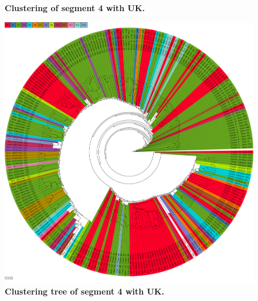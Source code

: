 \begin{figure}[!hbt]
\begin{subfigure}[b]{0.475\textwidth}
    \end{subfigure}
    \caption[Clustering of segment 4 with UK]{\textbf{Clustering of segment 4 with UK.} }
    \label{fig:UMAP_Cluster_Knee_4}
\end{figure}

\FloatBarrier

\begin{figure}[!hbt]
    \centering
    \includegraphics[width=\textwidth]{UMAP/Clustertree_Segment_4_H_Knee.pdf}
    \caption[Clustering tree of segment 4 with UK]{\textbf{Clustering tree of segment 4 with UK.} }
    \label{fig:UMAP_Clusteree_Knee_4}
\end{figure}

